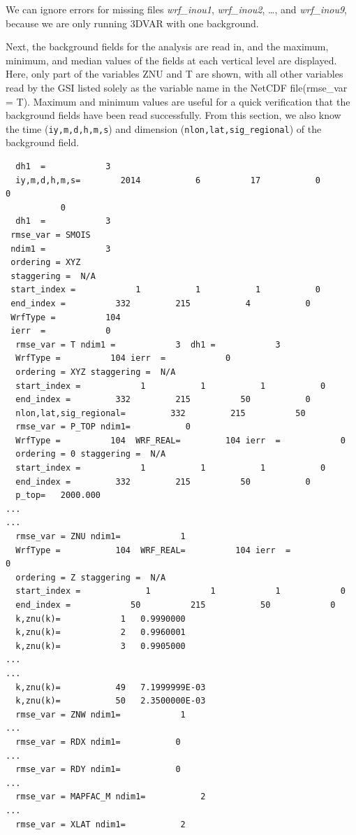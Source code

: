We can ignore errors for missing files \textit{wrf\_inou1}, \textit{wrf\_inou2}, \ldots, and \textit{wrf\_inou9}, because we are only running 3DVAR with one background.

Next, the background fields for the analysis are read in, and the maximum, minimum, and median values of the fields at each vertical level are displayed. Here, only part of the variables ZNU and T are shown, with all other variables read by the GSI listed solely as the variable name in the NetCDF file(rmse\_var = T). Maximum and minimum values are useful for a quick verification that the background fields have been read successfully. From this section, we also know the time (\verb|iy,m,d,h,m,s|) and dimension (\verb|nlon,lat,sig_regional|) of the background field.

\begin{scriptsize}
\begin{verbatim}
  dh1  =            3
  iy,m,d,h,m,s=        2014           6          17           0           0
           0
  dh1  =            3
 rmse_var = SMOIS
 ndim1 =            3
 ordering = XYZ
 staggering =  N/A
 start_index =            1           1           1           0
 end_index =          332         215           4           0
 WrfType =          104
 ierr  =            0
  rmse_var = T ndim1 =            3  dh1 =            3
  WrfType =          104 ierr  =            0
  ordering = XYZ staggering =  N/A
  start_index =            1           1           1           0  
  end_index =         332         215          50           0
  nlon,lat,sig_regional=         332         215          50
  rmse_var = P_TOP ndim1=           0
  WrfType =          104  WRF_REAL=         104 ierr  =            0
  ordering = 0 staggering =  N/A
  start_index =            1           1           1           0  
  end_index =         332         215          50           0
  p_top=   2000.000
...
...
  rmse_var = ZNU ndim1=            1
  WrfType =           104  WRF_REAL=          104 ierr  =             0
  ordering = Z staggering =  N/A
  start_index =             1            1            1            0
  end_index =            50          215           50            0
  k,znu(k)=            1   0.9990000
  k,znu(k)=            2   0.9960001
  k,znu(k)=            3   0.9905000
...
...
  k,znu(k)=           49   7.1999999E-03
  k,znu(k)=           50   2.3500000E-03
  rmse_var = ZNW ndim1=            1
...
  rmse_var = RDX ndim1=           0
...
  rmse_var = RDY ndim1=           0
...
  rmse_var = MAPFAC_M ndim1=           2
...
  rmse_var = XLAT ndim1=           2

\end{verbatim}
\end{scriptsize}
